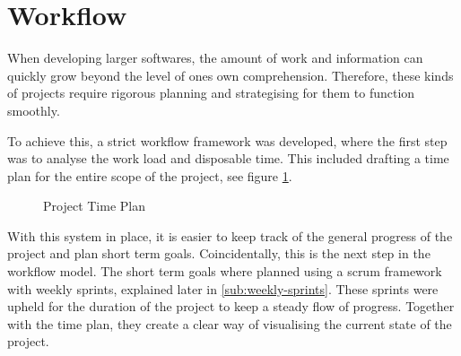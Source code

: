 \section{Workflow}
    When developing larger softwares, the amount of work and information can quickly grow beyond the level of ones own comprehension. Therefore, these kinds of projects require rigorous planning and strategising for them to function smoothly.

    To achieve this, a strict workflow framework was developed, where the first step was to analyse the work load and disposable time. This included drafting a time plan for the entire scope of the project, see figure \ref{fig:time-plan}. 

    \begin{figure}[ht]
        \centering
        \caption{Project Time Plan}
        \label{fig:time-plan}
    \end{figure}

    With this system in place, it is easier to keep track of the general progress of the project and plan short term goals. Coincidentally, this is the next step in the workflow model. The short term goals where planned using a scrum framework with weekly sprints, explained later in \ref{sub:weekly-sprints}. These sprints were upheld for the duration of the project to keep a steady flow of progress. Together with the time plan, they create a clear way of visualising the current state of the project.

